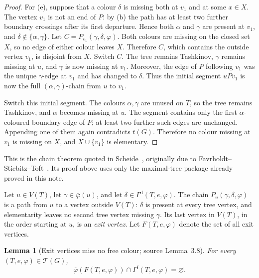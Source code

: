 \documentclass[11pt]{article}
\newtheorem{lemma}[lemma]{Lemma}
\theoremstyle{definition}
\newcommand{\Tcal}{\mathcal T}
\newcommand{\Dcol}{\Gamma^{\mathrm d}}
\newcommand{\Fcol}{\Gamma^{\mathrm f}}
\newcommand{\set}[1]{\{#1\}}
\begin{document}
\begin{proof}
For (e), suppose that a colour $\delta$ is missing both at $v_1$ and at
some $x\in X$. The vertex $v_1$ is not an end of $P$: by (b) the path has
at least two further boundary crossings after its first departure. Hence
both $\alpha$ and $\gamma$ are present at $v_1$, and
$\delta\notin\set{\alpha,\gamma}$. Let
$C=P_{v_1}(\gamma,\delta,\varphi)$. Both colours are missing on the closed
set $X$, so no edge of either colour leaves $X$. Therefore $C$, which
contains the outside vertex $v_1$, is disjoint from $X$.
Switch $C$. The tree remains Tashkinov, $\gamma$ remains missing at $u$,
and $\gamma$ is now missing at $v_1$. Moreover, the edge of $P$ following
$v_1$ was the unique $\gamma$-edge at $v_1$ and has changed to
$\delta$. Thus the initial segment $uPv_1$ is now the full
$(\alpha,\gamma)$-chain from $u$ to $v_1$.

Switch this initial segment. The colours $\alpha,\gamma$ are unused on
$T$, so the tree remains Tashkinov, and $\alpha$ becomes missing at $u$.
The segment contains only the first $\alpha$-coloured boundary edge of
$P$; at least two further such edges are unchanged. Appending one of them
again contradicts $t(G)$. Therefore no colour missing at $v_1$ is missing
on $X$, and $X\cup\set{v_1}$ is elementary.
\end{proof}

This is the chain theorem quoted in
Scheide~\cite[Proposition~3.6]{S}, originally due to
Favrholdt--Stiebitz--Toft~\cite{FST}. Its proof above uses only the
maximal-tree package already proved in this note.

Let $u\in V(T)$, let $\gamma\in\overline\varphi(u)$, and let
$\delta\in\Dcol(T,e,\varphi)$. The chain
$P_u(\gamma,\delta,\varphi)$ is a path from $u$ to a vertex outside $V(T)$:
$\delta$ is present at every tree vertex, and elementarity leaves no second
tree vertex missing $\gamma$. Its last vertex in $V(T)$, in the order
starting at $u$, is an \emph{exit vertex}. Let $F(T,e,\varphi)$ denote the
set of all exit vertices.

\setcounter{theorem}{7}
\begin{lemma}[Exit vertices miss no free colour; source Lemma~3.8]
\label{Scheide-Lemma-3.8}\label{exit-no-free}
For every $(T,e,\varphi)\in\Tcal(G)$,
\[
 \overline\varphi(F(T,e,\varphi))
 \cap\Fcol(T,e,\varphi)=\varnothing.
\]
\end{lemma}
\end{document}
